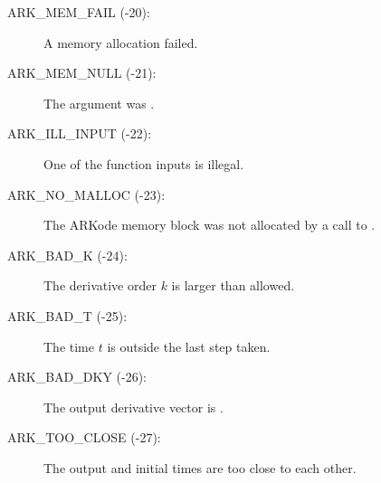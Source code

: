 \documentclass[letterpaper,10pt,english]{sphinxmanual}
\begin{document}
\begin{description}
\item[{ARK\_MEM\_FAIL  (-20):}] \leavevmode
A memory allocation failed.

\item[{ARK\_MEM\_NULL  (-21):}] \leavevmode
The  argument was .

\item[{ARK\_ILL\_INPUT  (-22):}] \leavevmode
One of the function inputs is illegal.

\item[{ARK\_NO\_MALLOC  (-23):}] \leavevmode
The ARKode memory block was not allocated by
a call to .

\item[{ARK\_BAD\_K  (-24):}] \leavevmode
The derivative order $k$ is larger than allowed.

\item[{ARK\_BAD\_T  (-25):}] \leavevmode
The time $t$ is outside the last step taken.

\item[{ARK\_BAD\_DKY  (-26):}] \leavevmode
The output derivative vector is .

\item[{ARK\_TOO\_CLOSE  (-27):}] \leavevmode
The output and initial times are too close to
each other.

\end{description}
\end{document}
